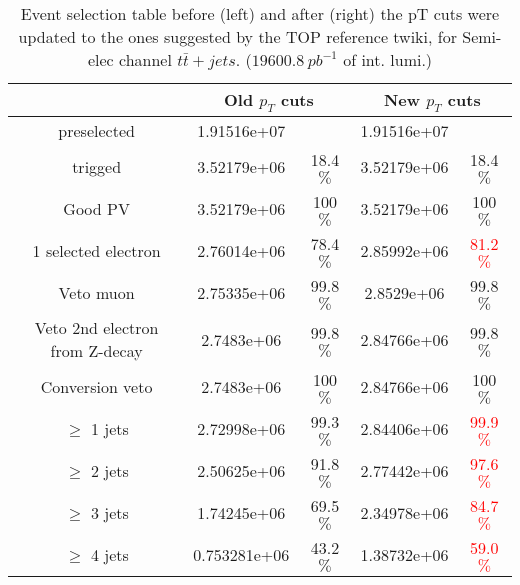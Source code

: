 \documentclass[a4paper,12pt]{report}
\begin{document}
\begin{table}
\caption{Event selection table before (left) and after (right) the pT cuts were updated to the ones suggested by the TOP reference twiki, for Semi-elec channel $t\bar{t}+jets$. ($19600.8~pb^{-1}$ of int. lumi.)}
\centering
\begin{tabular}{|c|c|c|c|c|}
\hline
				& \multicolumn{2}{|c|}{Old $p_T$ cuts}	& \multicolumn{2}{|c|}{New $p_T$ cuts}	\\
\hline
preselected			& 1.91516e+07	& 		 	& 1.91516e+07	&	 		\\

trigged				& 3.52179e+06	&	18.4 $\%$	& 3.52179e+06	&	18.4 $\%$	\\

Good PV				& 3.52179e+06	&	100 $\%$	& 3.52179e+06	&	100 $\%$	\\

1 selected electron		& 2.76014e+06	&	78.4 $\%$	& 2.85992e+06	&	\textcolor{red}{81.2 $\%$}	\\

Veto muon			& 2.75335e+06	&	99.8 $\%$	& 2.8529e+06	&	99.8 $\%$	\\

Veto 2nd electron from Z-decay	& 2.7483e+06	&	99.8 $\%$	& 2.84766e+06	&	99.8 $\%$	\\

Conversion veto			& 2.7483e+06	&	100 $\%$	& 2.84766e+06	&	100 $\%$	\\

$\geq$ 1 jets			& 2.72998e+06	&	99.3 $\%$	& 2.84406e+06	&	\textcolor{red}{99.9 $\%$}	\\

$\geq$ 2 jets			& 2.50625e+06	&	91.8 $\%$	& 2.77442e+06	&	\textcolor{red}{97.6 $\%$}	\\

$\geq$ 3 jets			& 1.74245e+06	&	69.5 $\%$	& 2.34978e+06	&	\textcolor{red}{84.7 $\%$}	\\

$\geq$ 4 jets			& 0.753281e+06	&	43.2 $\%$	& 1.38732e+06	&	\textcolor{red}{59.0 $\%$}	\\

\hline
\end{tabular}
\end{table}
\end{document}

